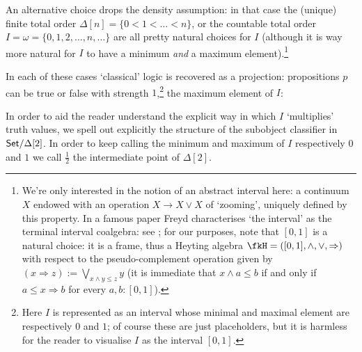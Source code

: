 An alternative choice drops the density assumption: in that case the (unique) finite total order $\Delta[n] = \{0 < 1 <\dots < n\}$, or the countable total order $I=\omega = \{0,1,2,\dots,n,\dots\}$ are all pretty natural choices for $I$ (although it is way more natural for $I$ to have a minimum \emph{and} a maximum element).\footnote{We're only interested in the notion of an abstract interval here: a continuum $X$ endowed with an operation $X \to X \vee X$ of `zooming', uniquely defined by this property. In a famous paper Freyd characterises `the interval' as the terminal interval coalgebra: see \cite[§1]{freyd2008algebraic}; for our purposes, note that $[0,1]$ is a natural choice: it is a frame, thus a Heyting algebra $\fkH =([0,1],\land,\lor,\Rightarrow)$ with respect to the pseudo-complement operation given by $(x \Rightarrow z) := \bigvee_{x\land y \le z} y$ (it is immediate that $x \land a \le b$ if and only if $a \le x \Rightarrow b$ for every $a,b: [0,1]$).}
\begin{remark}\label{fig_Omega}
  In each of these cases `classical' logic is recovered as a projection: propositions $p$ can be true or false with strength $1$,\footnote{Here $I$ is represented as an interval whose minimal and maximal element are respectively $0$ and $1$; of course these are just placeholders, but it is harmless for the reader to visualise $I$ as the interval $[0,1]$.} the maximum element of $I$:
  \begin{center}
  \end{center}
\end{remark}
In order to aid the reader understand the explicit way in which $I$ `multiplies' truth values, we spell out explicitly the structure of the subobject classifier in $\mathsf{Set}/\Delta[2]$. In order to keep calling the minimum and maximum of $I$ respectively $0$ and $1$ we call $\frac{1}{2}$ the intermediate point of $\Delta[2]$.
